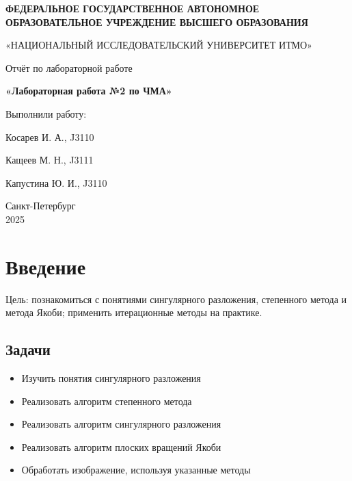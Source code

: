 \documentclass[a4paper, 12pt]{report}
\begin{document}
\begin{titlepage}
    \centering
    {\large \textbf{ФЕДЕРАЛЬНОЕ ГОСУДАРСТВЕННОЕ АВТОНОМНОЕ ОБРАЗОВАТЕЛЬНОЕ УЧРЕЖДЕНИЕ ВЫСШЕГО ОБРАЗОВАНИЯ} \par}
    {\large «НАЦИОНАЛЬНЫЙ ИССЛЕДОВАТЕЛЬСКИЙ УНИВЕРСИТЕТ ИТМО» \par}
    \vspace{9cm}
    {\large {Отчёт по лабораторной работе} \par}
    {\large \textbf{«Лабораторная работа №2 по ЧМА»} \par}

    \vfill 
    \begin{flushright}
        {\large Выполнили работу: \par}
        {\large Косарев И. А., J3110 \par}
        {\large Кащеев М. Н., J3111 \par}
        {\large Капустина Ю. И., J3110\par}
        \vspace{1cm}
    \end{flushright}
    \vspace{1cm}
    {\large Санкт-Петербург \\ 2025}
\end{titlepage}

\tableofcontents
\newpage

\chapter*{Введение}
\setcounter{chapter}{1}
\setcounter{section}{0}

Цель: познакомиться с понятиями сингулярного разложения, степенного метода и метода Якоби; применить 
итерационные методы на практике.

\section*{Задачи}
\begin{itemize}
    \item Изучить понятия сингулярного разложения
    \item Реализовать алгоритм степенного метода
    \item Реализовать алгоритм сингулярного разложения
    \item Реализовать алгоритм плоских вращений Якоби
    \item Обработать изображение, используя указанные методы
\end{itemize}
\end{document}
